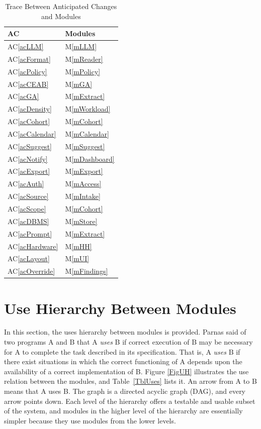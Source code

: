 \documentclass[12pt, titlepage]{article}
\newcommand{\acref}[1]{AC\ref{#1}}
\newcommand{\mref}[1]{M\ref{#1}}
\begin{document}
\begin{table}[H]
\centering
\begin{tabular}{p{} p{}}
\toprule
\textbf{AC} & \textbf{Modules}\\
\midrule
\acref{acLLM} & \mref{mLLM}\\
\acref{acFormat} & \mref{mReader}\\
\acref{acPolicy} & \mref{mPolicy}\\
\acref{acCEAB} & \mref{mGA}\\
\acref{acGA} & \mref{mExtract}\\
\acref{acDensity} & \mref{mWorkload}\\
\acref{acCohort} & \mref{mCohort}\\
\acref{acCalendar} & \mref{mCalendar}\\
\acref{acSuggest} & \mref{mSuggest}\\
\acref{acNotify} & \mref{mDashboard}\\
\acref{acExport} & \mref{mExport}\\
\acref{acAuth} & \mref{mAccess}\\
\acref{acSource} & \mref{mIntake}\\
\acref{acScope} & \mref{mCohort}\\
\acref{acDBMS} & \mref{mStore}\\
\acref{acPrompt} & \mref{mExtract}\\
\acref{acHardware} & \mref{mHH}\\
\acref{acLayout} & \mref{mUI}\\
\acref{acOverride} & \mref{mFindings}\\
\bottomrule
\end{tabular}
\caption{Trace Between Anticipated Changes and Modules}
\label{TblACT}
\end{table}

\section{Use Hierarchy Between Modules} \label{SecUse}

In this section, the uses hierarchy between modules is provided. Parnas
\citep{Parnas1978} said of two programs A and B that A {\em uses} B if correct
execution of B may be necessary for A to complete the task described in its
specification. That is, A {\em uses} B if there exist situations in which the
correct functioning of A depends upon the availability of a correct
implementation of B. Figure \ref{FigUH} illustrates the use relation between
the modules, and Table~\ref{TblUses} lists it. An arrow from A to B means that A
uses B. The graph is a directed acyclic graph (DAG), and every arrow points
down. Each level of the hierarchy offers a testable and usable subset of the
system, and modules in the higher level of the hierarchy are essentially simpler
because they use modules from the lower levels.
\end{document}
